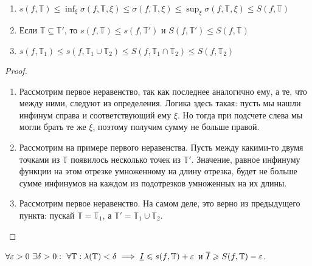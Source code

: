 \documentclass[a4paper]{article}
\theoremstyle{named}
\newcommand{\T}{\mathbb{T}}
\begin{document}
        \begin{lemma*}~

            \begin{enumerate}
            \item
                $s(f, \T) \leq \inf_{\xi} \sigma(f, \T, \xi) \leq \sigma(f, \T, \xi) \leq \sup_{\xi} \sigma(f, \T, \xi) \leq S(f, \T)$

            \item
                Если $\T \subseteq \T'$, то $s(f, \T) \leq s(f, \T')$ и $S(f, \T') \leq S(f, \T)$

            \item
                $s(f, \T_1) \leq s(f, \T_1 \cup \T_2) \leq S(f, \T_1 \cap \T_2) \leq S(f, \T_2)$
            \end{enumerate}
        \end{lemma*}

        \begin{proof}~

            \begin{enumerate}
            \item
                Рассмотрим первое неравенство, так как последнее аналогично ему, а те, что между ними, следуют из определения. Логика здесь такая: пусть мы нашли инфинум справа и соответствующий ему $\xi$. Но тогда при подсчете слева мы могли брать те же $\xi$, поэтому получим сумму не больше правой.

            \item
                Рассмотрим на примере первого неравенства. Пусть между какими-то двумя точками из $\T$ появилось несколько точек из $\T'$. Значение, равное инфинуму функции на этом отрезке умноженному на длину отрезка, будет не больше сумме инфинумов на каждом из подотрезков умноженных на их длины.

            \item
                Рассмотрим первое неравенство. На самом деле, это верно из предыдущего пункта: пускай $\T = \T_1$, а $\T' = \T_1 \cup \T_2$.
            \end{enumerate}
        \end{proof}

        \begin{lemma*}
            $\forall \eps > 0 \ \exists \delta > 0: \ \forall \T: \lambda(\T) < \delta \implies \underline{I} \leq s(f, \T) + \eps$ и $\overline{I} \geq S(f, \T) - \eps$.
        \end{lemma*}
\end{document}
